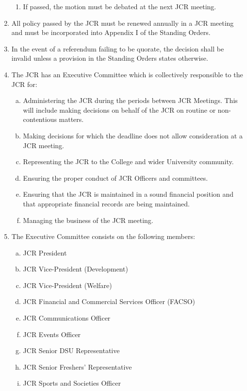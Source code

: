 \documentclass[12pt]{article}  %
\begin{document}
\begin{enumerate}
    \begin{enumerate}
        \item If passed, the motion must be debated at the next JCR meeting.
    \end{enumerate}
    \item All policy passed by the JCR must be renewed annually in a JCR meeting and must be incorporated into Appendix I of the Standing Orders.
    \item In the event of a referendum failing to be quorate, the decision shall be invalid unless a provision in the Standing Orders states otherwise.
    \item The JCR has an Executive Committee which is collectively responsible to the JCR for:
    \begin{enumerate}[(a)]
        \item Administering the JCR during the periods between JCR Meetings. This will include making decisions on behalf of the JCR on routine or non-contentious matters.
        \item Making decisions for which the deadline does not allow consideration at a JCR meeting.
        \item Representing the JCR to the College and wider University community.
        \item Ensuring the proper conduct of JCR Officers and committees.
        \item Ensuring that the JCR is maintained in a sound financial position and that appropriate financial records are being maintained.
        \item Managing the business of the JCR meeting.
    \end{enumerate}
    \item The Executive Committee consists on the following members:
    \begin{enumerate}[(a)]
        \item JCR President
        \item JCR Vice-President (Development)
        \item JCR Vice-President (Welfare)
        \item JCR Financial and Commercial Services Officer (FACSO)
        \item JCR Communications Officer
        \item JCR Events Officer
        \item JCR Senior DSU Representative
        \item JCR Senior Freshers’ Representative
        \item JCR Sports and Societies Officer

\end{enumerate}
\end{enumerate}
\end{document}
